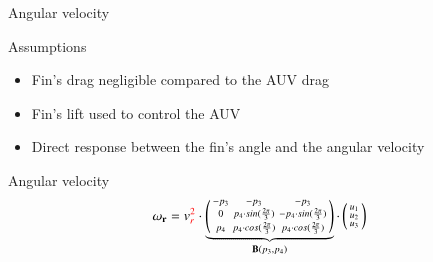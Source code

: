 \documentclass[10pt, xcolor={usenames, dvipsnames}]{beamer}
\begin{document}
        \begin{frame}{Angular velocity}
            \centering
            \begin{minipage}{0.8\textwidth}
                \begin{block}{Assumptions}
                    \vspace{0.2cm}
                    \begin{itemize}
                        \item Fin's drag negligible compared to the AUV drag
                        \item Fin's lift used to control the AUV
                        \item Direct response between the fin's angle and the angular velocity
                    \end{itemize}
                \end{block}
                \begin{block}{Angular velocity}
                    \begin{equation}
                        \mathbf{\omega_r} = v_r^{\color{red}{2}} \cdot 
                            \underbrace{
                                \left(
                                \begin{smallmatrix}
                                    -p_3 & -p_3 & -p_3 \\
                                    0 & p_4 \cdot sin(\frac{2\pi}{3}) & -p_4 \cdot sin(\frac{2\pi}{3}) \\
                                    p_4 & p_4 \cdot cos(\frac{2\pi}{3}) & p_4 \cdot cos(\frac{2\pi}{3})
                                \end{smallmatrix}
                                \right)
                            }_{\mathbf{B}(p_3, p_4)} \cdot \left(\begin{smallmatrix}u_1\\ u_2\\ u_3\end{smallmatrix}\right)
                    \end{equation}
                \end{block}
            \end{minipage}
        \end{frame}
\end{document}
